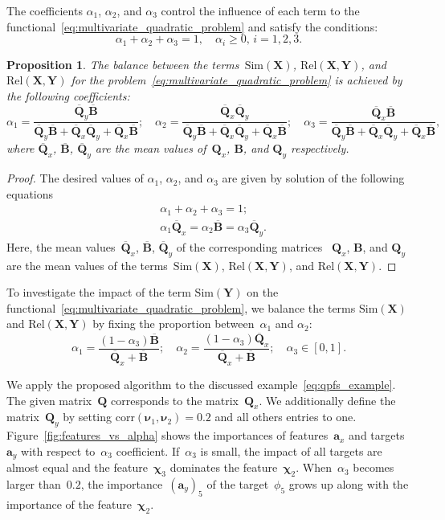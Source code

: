 \documentclass[12pt,twoside]{article}
\newtheorem{proposition}{Proposition}
\theoremstyle{definition}
\newcommand{\ba}{\mathbf{a}}
\newcommand{\bY}{\mathbf{Y}}
\newcommand{\bX}{\mathbf{X}}
\newcommand{\bB}{\mathbf{B}}
\newcommand{\bQ}{\mathbf{Q}}
\newcommand{\bchi}{\boldsymbol{\chi}}
\newcommand{\bnu}{\boldsymbol{\nu}}
\begin{document}
The coefficients $\alpha_1$, $\alpha_2$, and $\alpha_3$ control the influence of each term to the functional~\eqref{eq:multivariate_quadratic_problem} and satisfy the conditions:
\[
\alpha_1 + \alpha_2 + \alpha_3 = 1, \quad \alpha_i \geq 0, \, i = 1, 2, 3.
\]
\begin{proposition}
	The balance between the terms~$\text{Sim}(\bX)$, $\text{Rel}(\bX, \bY)$, and $\text{Rel}(\bX, \bY)$ for the problem~\eqref{eq:multivariate_quadratic_problem} is achieved by the following coefficients:
	\[
	\alpha_1 = \frac{\overline{\bQ}_y \overline{\bB} }{\overline{\bQ}_y \overline{\bB} + \overline{\bQ}_x \overline{\bQ}_y + \overline{\bQ}_x \overline{\bB}}; \quad
	\alpha_2 = \frac{\overline{\bQ}_x \overline{\bQ}_y}{\overline{\bQ}_y \overline{\bB} + \overline{\bQ}_x \overline{\bQ}_y + \overline{\bQ}_x \overline{\bB}}; \quad
	\alpha_3  = \frac{\overline{\bQ}_x \overline{\bB}}{\overline{\bQ}_y \overline{\bB} + \overline{\bQ}_x \overline{\bQ}_y + \overline{\bQ}_x \overline{\bB}},
	\]
	where $\overline{\bQ}_x$, $\overline{\bB}$, $\overline{\bQ}_y$ are the mean values of~$\bQ_x$, $\bB$, and $\bQ_y$ respectively.

\end{proposition}
\begin{proof}
	The desired values of $\alpha_1$, $\alpha_2$, and $\alpha_3$ are given by solution of the following equations
	\begin{align*}
		&\alpha_1 + \alpha_2 + \alpha_3 = 1; \\
		&\alpha_1 \overline{\bQ}_x = \alpha_2 \overline{\bB} = \alpha_3 \overline{\bQ}_y.
	\end{align*}
	Here, the mean values~$\overline{\bQ}_x$, $\overline{\bB}$, $\overline{\bQ}_y$ of the corresponding matrices ~$\bQ_x$, $\bB$, and $\bQ_y$ are the mean values of the terms~$\text{Sim}(\bX)$, $\text{Rel}(\bX, \bY)$, and $\text{Rel}(\bX, \bY)$.
\end{proof}
To investigate the impact of the term $\text{Sim}(\bY)$ on the functional~\eqref{eq:multivariate_quadratic_problem}, we balance the terms $\text{Sim}(\bX)$ and $\text{Rel}(\bX, \bY)$ by fixing the proportion between~$\alpha_1$ and $\alpha_2$:
\begin{equation}
\alpha_1 = \frac{(1 - \alpha_3)\overline{\bB}}{\overline{\bQ}_x + \overline{\bB}}; \quad
\alpha_2 = \frac{(1 - \alpha_3)\overline{\bQ}_x}{\overline{\bQ}_x + \overline{\bB}}; \quad
\alpha_3 \in [0, 1].
\label{eq:alphas3}
\end{equation}

We apply the proposed algorithm to the discussed example~\eqref{eq:qpfs_example}.
The given matrix~$\bQ$ corresponds to the matrix~$\bQ_x$.
We additionally define the matrix~$\bQ_y$ by setting $\text{corr}(\bnu_1, \bnu_2) = 0.2$ and all others entries to one.
Figure~\ref{fig:features_vs_alpha} shows the importances of features~$\ba_x$ and targets~$\ba_y$ with respect to~$\alpha_3$ coefficient.
If~$\alpha_3$ is small, the impact of all targets are almost equal and the feature~$\bchi_3$ dominates the feature~$\bchi_2$. When~$\alpha_3$ becomes larger than~$0.2$, the importance~$(\ba_y)_5$ of the target~$\phi_5$ grows up along with the importance of the feature~$\bchi_2$.
\end{document}
